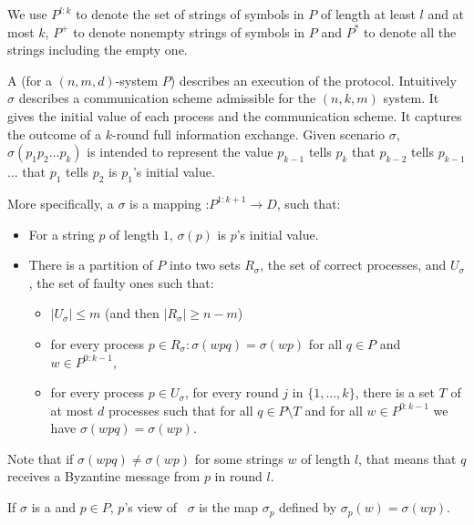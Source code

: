 {{We use $P^{l:k}$ to denote the set of strings of symbols in $P$ of length at least $l$ 
and at most $k$, $P^{+}$ to denote nonempty strings of symbols in $P$
and $P^{*}$ to denote all the strings including the empty one.

 A {} (for a $(n,m,d)$-system $P$) describes an
 execution of the protocol. Intuitively  $\sigma$ describes a 
 communication scheme admissible for the $(n,k,m)$ system.
 It gives the initial value of each process and the communication scheme.
It captures the outcome of a $k$-round full information exchange.
Given scenario $\sigma$, 
$\sigma ( p_{1}
p_{2} \ldots p_{k} )$ is intended to represent the value $p_{k-1}$
tells $p_k$ that $p_{k-2}$ tells $p_{k-1}$ ... that $p_1$ tells $p_2$
is $p_1$'s initial value. 

 More specifically,  a  {} $\sigma$
  is a mapping :$P^{1:k+1}
\rightarrow D$, such that:
\begin{itemize}
\item
For a string $p$ of length $1$, $\sigma(p)$ is $p$'s initial value. 
\item
There is a partition of $P$ into two sets $R_{\sigma} $, the set of
correct processes,  and $U_\sigma$, the set of faulty ones
such that:
\begin{itemize}
\item
$|U_\sigma| \leq m$ (and then $|R_\sigma|\geq n-m$)
\item
for every  process $p\in R_{\sigma} : \sigma(w p q) = \sigma(w p)$ for all
$q\in P$ and $w\in P^{0:k-1}$,  
\item
for every process $p\in U_\sigma$,  for every round $j$ in $\{1,\ldots
, k\}$,  there is a set $T$ of at most $d$ processes such that for
all $q\in P\setminus T$  and for all
$w\in P^{0:k-1}$ we have $\sigma(w p q) = \sigma(w p)$.
\end{itemize}
\end{itemize}
Note that if  $\sigma(wpq) \neq \sigma(wp)$ for some strings $w$ of
length $l$, that means that $q$  receives a Byzantine message from $p$
in round $l$.



If $\sigma$ is a
{} and $p \in P$, $p$'s view of \ $\sigma$ is
the map $\sigma_p$ defined by 
$\sigma_{p} ( w ) = \sigma ( w p )$. 


}}
